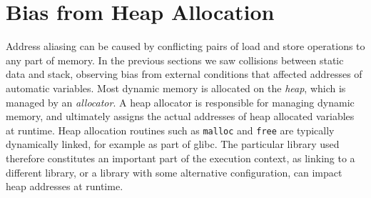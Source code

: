 \documentclass[prodmode,acmtaco]{acmsmall}
\begin{document}
{\section{Bias from Heap Allocation}
\label{sec:heap}
Address aliasing can be caused by conflicting pairs of load and store operations to any part of memory.
In the previous sections we saw collisions between static data and stack, observing bias from external conditions that affected addresses of automatic variables.
Most dynamic memory is allocated on the \emph{heap}, which is managed by an \emph{allocator}.
A heap allocator is responsible for managing dynamic memory, and ultimately assigns the actual addresses of heap allocated variables at runtime.
Heap allocation routines such as \texttt{malloc} and \texttt{free} are typically dynamically linked, for example as part of glibc.
The particular library used therefore constitutes an important part of the execution context, as linking to a different library, or a library with some alternative configuration, can impact heap addresses at runtime.


}
\end{document}
